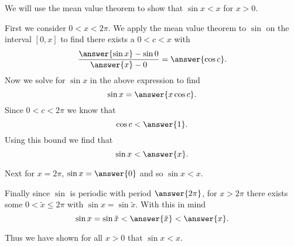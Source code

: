\documentclass{ximera}
\author{Steven Gubkin}
\begin{document}
\begin{exercise}

We will use the mean value theorem to show that $\sin x<x$ for $x>0$.

First we consider $0<x<2\pi$.  We apply the mean value theorem to $\sin$ on the interval $[0,x]$ to find there exists a $0<c<x$ with 
\[
\frac{\answer{\sin{x}}-\sin{0}}{\answer{x}-0} = \answer{\cos{c}}.
\]
Now we solve for $\sin{x}$ in the above expression to find
\[
\sin{x} = \answer{x\cos{c}}.
\]
Since $0<c<2\pi$ we know that 
\[
\cos{c} < \answer{1}.
\]
Using this bound we find that 
\[
\sin{x} < \answer{x}.
\]

Next for $x=2\pi$, $\sin{x}=\answer{0}$ and so $\sin{x}<x$.

Finally since $\sin$ is periodic with period $\answer{2\pi}$, for $x>2\pi$ there exists some $0<\tilde{x}\leq2\pi$ with $\sin{x}=\sin{\tilde{x}}$.  With this in mind
\[
\sin{x}=\sin{\tilde{x}}<\answer{\tilde{x}}<\answer{x}.
\]

Thus we have shown for all $x>0$ that $\sin{x}<x$.

\end{exercise}
\end{document}
